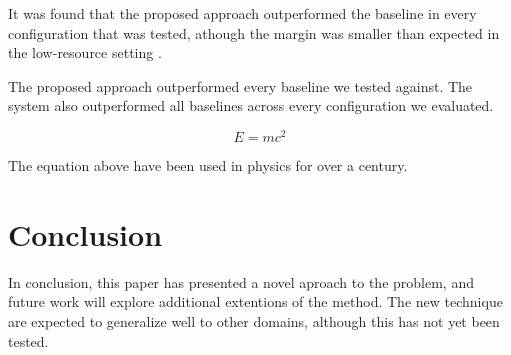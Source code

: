 \documentclass{article}
\begin{document}
It was found that the proposed approach outperformed the baseline in
every configuration that was tested, athough the margin was smaller
than expected in the low-resource setting \cite{jones2019}.

The proposed approach outperformed every baseline we tested against.
The system also outperformed all baselines across every configuration
we evaluated.

\begin{equation}
E = mc^2
\end{equation}

The equation above have been used in physics for over a century.

\section{Conclusion}

In conclusion, this paper has presented a novel aproach to the problem,
and future work will explore additional extentions of the method. The
new technique are expected to generalize well to other domains, although
this has not yet been tested.
\end{document}
